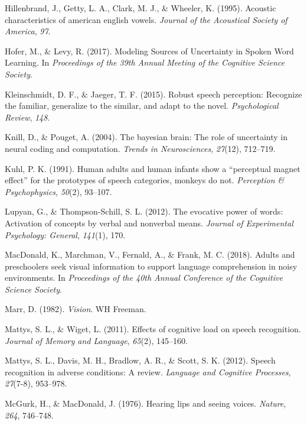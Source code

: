 \documentclass[english,floatsintext,man]{apa6}
\theoremstyle{definition}
\theoremstyle{definition}
\theoremstyle{definition}
\theoremstyle{remark}
\begin{document}
\hypertarget{ref-hillenbrand1995}{}
Hillenbrand, J., Getty, L. A., Clark, M. J., \& Wheeler, K. (1995).
Acoustic characteristics of american english vowels. \emph{Journal of
the Acoustical Society of America}, \emph{97}.

\hypertarget{ref-hofer2017}{}
Hofer, M., \& Levy, R. (2017). Modeling Sources of Uncertainty in Spoken
Word Learning. In \emph{Proceedings of the 39th Annual Meeting of the
Cognitive Science Society}.

\hypertarget{ref-kleinschmidt2015}{}
Kleinschmidt, D. F., \& Jaeger, T. F. (2015). Robust speech perception:
Recognize the familiar, generalize to the similar, and adapt to the
novel. \emph{Psychological Review}, \emph{148}.

\hypertarget{ref-Knill04}{}
Knill, D., \& Pouget, A. (2004). The bayesian brain: The role of
uncertainty in neural coding and computation. \emph{Trends in
Neurosciences}, \emph{27}(12), 712--719.

\hypertarget{ref-kuhl1991}{}
Kuhl, P. K. (1991). Human adults and human infants show a ``perceptual
magnet effect'' for the prototypes of speech categories, monkeys do not.
\emph{Perception \& Psychophysics}, \emph{50}(2), 93--107.

\hypertarget{ref-lupyan2012}{}
Lupyan, G., \& Thompson-Schill, S. L. (2012). The evocative power of
words: Activation of concepts by verbal and nonverbal means.
\emph{Journal of Experimental Psychology: General}, \emph{141}(1), 170.

\hypertarget{ref-macdonald2018}{}
MacDonald, K., Marchman, V., Fernald, A., \& Frank, M. C. (2018). Adults
and preschoolers seek visual information to support language
comprehension in noisy environments. In \emph{Proceedings of the 40th
Annual Conference of the Cognitive Science Society}.

\hypertarget{ref-marr1982}{}
Marr, D. (1982). \emph{Vision}. WH Freeman.

\hypertarget{ref-mattys11}{}
Mattys, S. L., \& Wiget, L. (2011). Effects of cognitive load on speech
recognition. \emph{Journal of Memory and Language}, \emph{65}(2),
145--160.

\hypertarget{ref-mattys12}{}
Mattys, S. L., Davis, M. H., Bradlow, A. R., \& Scott, S. K. (2012).
Speech recognition in adverse conditions: A review. \emph{Language and
Cognitive Processes}, \emph{27}(7-8), 953--978.

\hypertarget{ref-mcgurk1976}{}
McGurk, H., \& MacDonald, J. (1976). Hearing lips and seeing voices.
\emph{Nature}, \emph{264}, 746--748.
\end{document}
